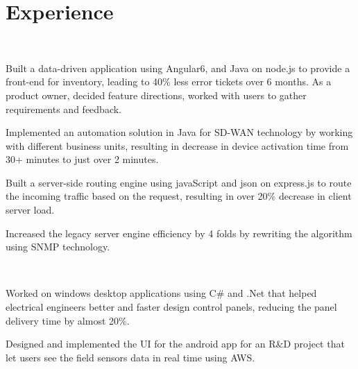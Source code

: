 \documentclass[]{rinkal_resume}
\begin{document}
\begin{minipage}[t]{0.69\textwidth} 


\section{Experience}

\hfill\   
\vspace{\topsep} %
\begin{tightemize}
\item Built a data-driven application using Angular6, and Java on node.js to provide a front-end for inventory, leading to 40\% less error tickets over 6 months. As a product owner, decided feature directions, worked with users to gather requirements and feedback.
\item Implemented an automation solution in Java for SD-WAN technology by working with different business units, resulting in decrease in device activation time from 30+ minutes to just over 2 minutes.
\item Built a server-side routing engine using javaScript and json on express.js to route the incoming traffic based on the request, resulting in over 20\% decrease in client server load.
\item Increased the legacy server engine efficiency by 4 folds by rewriting the algorithm using SNMP technology.
\end{tightemize}
\sectionsep

 \\
\begin{tightemize}
\item Worked on windows desktop applications using C\# and .Net that helped electrical engineers better and faster design control panels, reducing the panel delivery time by almost 20\%.
\item Designed and implemented the UI for the android app for an R\&D project that let users see the field sensors data in real time using AWS.
\end{tightemize}
\sectionsep




\end{minipage}
\end{document}
